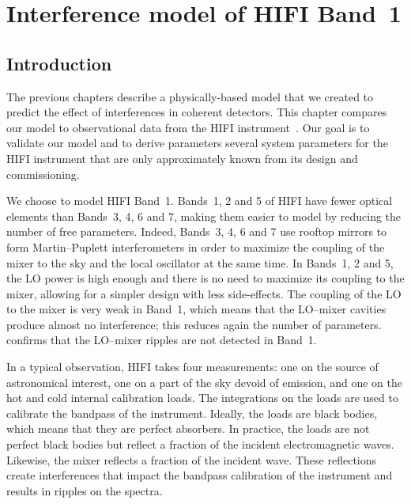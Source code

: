 \cleardoublepage
\chapter{Interference model of HIFI Band~1}
\label{sec:chapter4}


\section{Introduction}
The previous chapters describe a physically-based model that we created to predict the effect of interferences in coherent detectors.
This chapter compares our model to observational data from the HIFI instrument~\parencite{AA_518_L6}.
Our goal is to validate our model and to derive parameters several system parameters for the HIFI instrument that are only approximately known from its design and commissioning.

We choose to model HIFI Band~1.
Bands~1, 2 and 5 of HIFI have fewer optical elements than Bands~3, 4, 6 and 7, making them easier to model by reducing the number of free parameters.
Indeed, Bands~3, 4, 6 and 7 use rooftop mirrors to form Martin--Puplett interferometers in order to maximize the coupling of the mixer to the sky and the local oscillator at the same time.
In Bands~1, 2 and 5, the LO power is high enough and there is no need to maximize its coupling to the mixer, allowing for a simpler design with less side-effects.
The coupling of the LO to the mixer is very weak in Band~1, which means that the LO--mixer cavities produce almost no interference;
this reduces again the number of parameters.
\Textcite{risacher2011standingwaves} confirms that the LO--mixer ripples are not detected in Band~1.

In a typical observation, HIFI takes four measurements: one on the source of astronomical interest, one on a part of the sky devoid of emission, and one on the hot and cold internal calibration loads.
The integrations on the loads are used to calibrate the bandpass of the instrument.
Ideally, the loads are black bodies, which means that they are perfect absorbers.
In practice, the loads are not perfect black bodies but reflect a fraction of the incident electromagnetic waves.
Likewise, the mixer reflects a fraction of the incident wave.
These reflections create interferences that impact the bandpass calibration of the instrument and results in ripples on the spectra.




